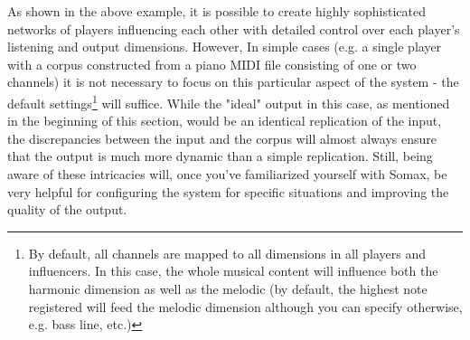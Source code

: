 As shown in the above example, it is possible to create highly sophisticated networks of players influencing each other with detailed control over each player's listening and output dimensions. However, In simple cases (e.g. a single player with a corpus constructed from a piano MIDI file consisting of one or two channels) it is not necessary to focus on this particular aspect of the system -  the default settings\footnote{By default,  all channels are mapped to all dimensions in all players and influencers. In this case, the whole musical content will influence both the harmonic dimension as well as the melodic (by default, the highest note registered will feed the melodic dimension although you can specify otherwise, e.g. bass line, etc.)} will suffice. While the "ideal" output in this case, as mentioned in the beginning of this section, would be an identical replication of the input, the discrepancies between the input and the corpus will almost always ensure that the output is much more dynamic than a simple replication. Still, being aware of these intricacies will, once you've familiarized yourself with Somax, be very helpful for configuring the system for specific situations and improving the quality of the output.

